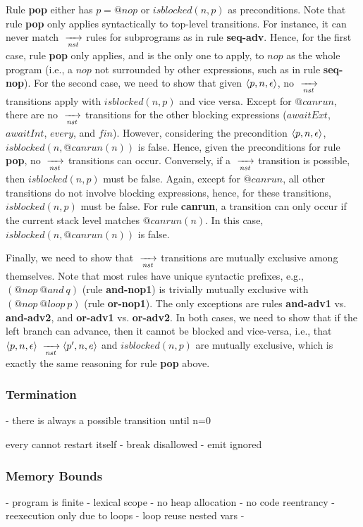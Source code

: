 Rule \textbf{pop} either has $p=@nop$ or $isblocked(n,p)$ as preconditions.
%
Note that rule \textbf{pop} only applies syntactically to top-level
transitions.
For instance, it can never match $\;\xrightarrow[\mathit{nst}]{\;}$ rules for subprograms as in rule
\textbf{seq-adv}.
%
Hence, for the first case, rule \textbf{pop} only applies, and is the only one
to apply, to $nop$ as the whole program (i.e., a $nop$ not surrounded by other
expressions, such as in rule \textbf{seq-nop}).
%
For the second case, we need to show that given $\langle p,n,\epsilon \rangle$, no
$\;\xrightarrow[\mathit{nst}]{\;}$ transitions apply with $isblocked(n,p)$ and vice versa.
Except for $@canrun$, there are no $\;\xrightarrow[\mathit{nst}]{\;}$ transitions for the other blocking
expressions ($awaitExt$, $awaitInt$, $every$, and $fin$).
However, considering the precondition $\langle p,n,\epsilon \rangle$,
$isblocked(n,@canrun(n))$ is false.
Hence, given the preconditions for rule \textbf{pop}, no $\;\xrightarrow[\mathit{nst}]{\;}$ transitions can
occur.
Conversely, if a $\;\xrightarrow[\mathit{nst}]{\;}$ transition is possible, then $isblocked(n,p)$ must be
false.
Again, except for $@canrun$, all other transitions do not involve blocking
expressions, hence, for these transitions, $isblocked(n,p)$ must be false.
For rule \textbf{canrun}, a transition can only occur if the current stack
level matches $@canrun(n)$.
In this case, $isblocked(n,@canrun(n))$ is false.

Finally, we need to show that $\;\xrightarrow[\mathit{nst}]{\;}$ transitions are mutually exclusive among
themselves.
%
Note that most rules have unique syntactic prefixes, e.g., $(@nop~@and~q)$
(rule \textbf{and-nop1}) is trivially mutually exclusive with $(@nop~@loop~p)$
(rule \textbf{or-nop1}).
%
The only exceptions are rules \textbf{and-adv1} vs. \textbf{and-adv2}, and
\textbf{or-adv1} vs. \textbf{or-adv2}.
In both cases, we need to show that if the left branch can advance, then it
cannot be blocked and vice-versa, i.e., that 
$\langle p,n,\epsilon \rangle \;\xrightarrow[\mathit{nst}]{\;} \langle p',n,e \rangle$ and $isblocked(n,p)$ are mutually
exclusive, which is exactly the same reasoning for rule \textbf{pop} above.

\subsubsection*{Termination}

- there is always a possible transition until n=0

every cannot restart itself
    - break disallowed
    - emit ignored

\subsubsection*{Memory Bounds}

- program is finite
- lexical scope
    - no heap allocation
- no code reentrancy
    - reexecution only due to loops
    - loop reuse nested vars
- 
